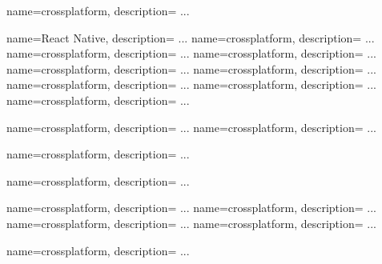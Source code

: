 
 {
  name=crossplatform,
  description={
		...
	}
}

 {
  name=React Native,
  description={
		...
	}
}
 {
  name=crossplatform,
  description={
		...
	}
}
 {
  name=crossplatform,
  description={
		...
	}
}
 {
  name=crossplatform,
  description={
		...
	}
}
 {
  name=crossplatform,
  description={
		...
	}
}
 {
  name=crossplatform,
  description={
		...
	}
}
 {
  name=crossplatform,
  description={
		...
	}
}
 {
  name=crossplatform,
  description={
		...
	}
}
 {
  name=crossplatform,
  description={
		...
	}
}

 {
  name=crossplatform,
  description={
		...
	}
}
 {
  name=crossplatform,
  description={
		...
	}
}

 {
  name=crossplatform,
  description={
		...
	}
}

 {
  name=crossplatform,
  description={
		...
	}
}

 {
  name=crossplatform,
  description={
		...
	}
}
 {
  name=crossplatform,
  description={
		...
	}
}
 {
  name=crossplatform,
  description={
		...
	}
}
 {
  name=crossplatform,
  description={
		...
	}
}

 {
  name=crossplatform,
  description={
		...
	}
}

